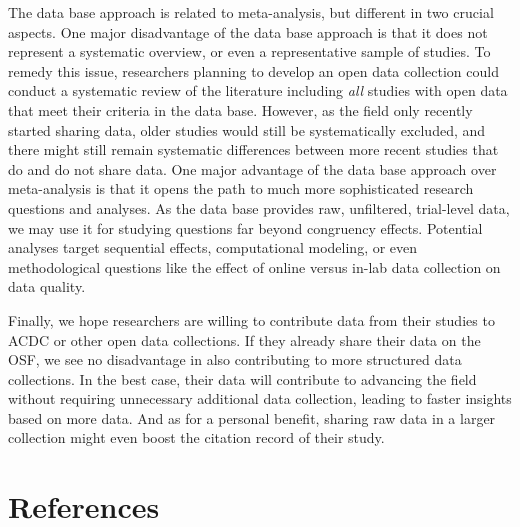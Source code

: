\documentclass[
  man,floatsintext]{apa6}
\begin{document}
The data base approach is related to meta-analysis, but different in two crucial aspects. One major disadvantage of the data base approach is that it does not represent a systematic overview, or even a representative sample of studies. To remedy this issue, researchers planning to develop an open data collection could conduct a systematic review of the literature including \emph{all} studies with open data that meet their criteria in the data base. However, as the field only recently started sharing data, older studies would still be systematically excluded, and there might still remain systematic differences between more recent studies that do and do not share data. One major advantage of the data base approach over meta-analysis is that it opens the path to much more sophisticated research questions and analyses. As the data base provides raw, unfiltered, trial-level data, we may use it for studying questions far beyond congruency effects. Potential analyses target sequential effects, computational modeling, or even methodological questions like the effect of online versus in-lab data collection on data quality.

Finally, we hope researchers are willing to contribute data from their studies to ACDC or other open data collections. If they already share their data on the OSF, we see no disadvantage in also contributing to more structured data collections. In the best case, their data will contribute to advancing the field without requiring unnecessary additional data collection, leading to faster insights based on more data. And as for a personal benefit, sharing raw data in a larger collection might even boost the citation record of their study.

\newpage

\hypertarget{references}{%
\section{References}\label{references}}
\end{document}
